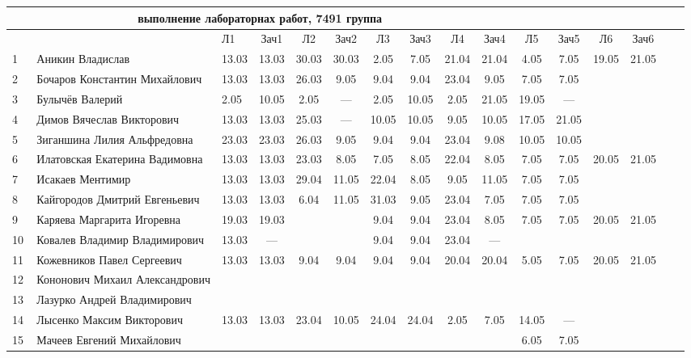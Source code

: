 \documentclass[a4paper,11pt]{article}
\begin{document}
\newpage
{}
\recalctypearea
\hspace{-6.1cm} %
\begin{tabular}{l|llccccccccccccc}
\multicolumn{10}{c}{выполнение лабораторнах работ, 7491 группа} \\
\toprule
&&Л1&Зач1& Л2&Зач2& Л3&Зач3& Л4&Зач4&  Л5&Зач5& Л6&Зач6&\\
\midrule
1\,&Аникин Владислав                &13.03&13.03 &30.03&30.03& 2.05& 7.05&21.04&21.04& 4.05& 7.05 &19.05&21.05\\
2\,&Бочаров Константин Михайлович   &13.03&13.03 &26.03& 9.05& 9.04& 9.04&23.04& 9.05& 7.05& 7.05\\
3\,&Булычёв Валерий                 & 2.05&10.05 & 2.05& --- & 2.05&10.05& 2.05&21.05&19.05& ---\\
4\,&Димов Вячеслав Викторович       &13.03&13.03 &25.03& --- &10.05&10.05& 9.05&10.05&17.05&21.05\\
5\,&Зиганшина Лилия Альфредовна     &23.03&23.03 &26.03& 9.05& 9.04& 9.04&23.04& 9.08&10.05&10.05\\
\midrule
6\,&Илатовская Екатерина Вадимовна  &13.03&13.03 &23.03& 8.05& 7.05& 8.05&22.04& 8.05& 7.05& 7.05&20.05&21.05\\
7\,&Исакаев Ментимир                &13.03&13.03 &29.04&11.05&22.04& 8.05& 9.05&11.05& 7.05& 7.05\\
8\,&Кайгородов Дмитрий Евгеньевич   &13.03&13.03 & 6.04&11.05&31.03& 9.05&23.04& 7.05& 7.05& 7.05\\
9\,&Каряева Маргарита Игоревна      &19.03&19.03 &     &     & 9.04& 9.04&23.04& 8.05& 7.05& 7.05&20.05&21.05\\
10\,&Ковалев Владимир Владимирович  &13.03& ---  &     &     & 9.04& 9.04&23.04& --- & &\\
\midrule
11\,&Кожевников Павел Сергеевич     &13.03&13.03 & 9.04& 9.04& 9.04& 9.04&20.04&20.04& 5.05& 7.05&20.05&21.05\\
12\,&Кононович Михаил Александрович &     &      &     &     &     &     &     &\\
13\,&Лазурко Андрей Владимирович    &     &      &     &     &     &     &     &\\
14\,&Лысенко Максим Викторович      &13.03&13.03 &23.04&10.05&24.04&24.04& 2.05& 7.05&14.05& --- \\
15\,&Мачеев Евгений Михайлович      &     &      &     &     &     &     &     &     & 6.05& 7.05\\

\end{tabular}
\end{document}
